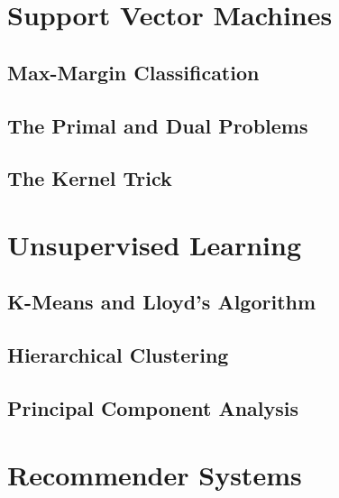 \section{Support Vector Machines}
\label{sec:svm}

\subsection{Max-Margin Classification}

\subsection{The Primal and Dual Problems}

\subsection{The Kernel Trick}


\section{Unsupervised Learning}
\label{sec:unsupervised}

\subsection{K-Means and Lloyd's Algorithm}

\subsection{Hierarchical Clustering}

\subsection{Principal Component Analysis}
\label{sec:pca}


\section{Recommender Systems}
\label{sec:recommenders}

